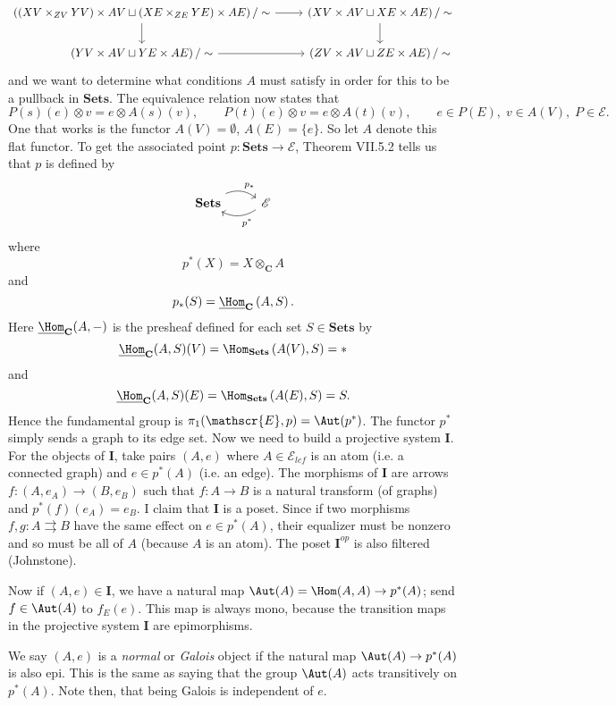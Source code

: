 \[ \begin{tikzcd}
\left( \left( XV \times_{ZV} YV \right) \times AV \sqcup \left( XE \times_{ZE} YE \right) \times AE\right) / \sim \arrow[r] \arrow[d] & \left( XV \times AV \sqcup XE \times AE \right) / \sim \arrow[d] \\
\left( YV \times AV \sqcup YE \times AE \right) / \sim \arrow[r] & \left( ZV \times AV \sqcup ZE \times AE \right) / \sim
\end{tikzcd}\]
and we want to determine what conditions $A$ must satisfy in order for this to be a pullback in $\mathbf{Sets}$. The equivalence relation now states that
\[ P(s)(e) \otimes v = e \otimes A(s)(v), \qquad P(t)(e) \otimes v = e \otimes A(t)(v), \qquad e \in P(E), \; v \in A(V), \; P \in \mathscr{E}. \]
One that works is the functor $A(V) = \emptyset$, $A(E) = \{e\}$. So let $A$ denote this flat functor. To get the associated point $p : \mathbf{Sets} \to \mathscr{E}$, Theorem VII.5.2 tells us that $p$ is defined by
\[ \begin{tikzcd} \mathbf{Sets} \arrow[r, bend left, "p_*"] & \mathscr{E} \arrow[l, bend left, "p^*"] \end{tikzcd} \]
where
\[ p^*(X) = X \otimes_{\mathbf{C}} A \]
and
\[ p_*(S) = \underline{\Hom}_{\mathbf{C}}\left(A, S\right). \]
Here $\underline{\Hom}_{\mathbf{C}}(A,-)$ is the presheaf defined for each set $S \in \mathbf{Sets}$ by
\[ \underline{\Hom}_{\mathbf{C}}(A,S)(V) = \Hom_{\mathbf{Sets}}\left(A(V), S\right) = * \]
and
\[ \underline{\Hom}_{\mathbf{C}}(A,S)(E) = \Hom_{\mathbf{Sets}}\left(A(E), S\right) = S. \]
Hence the fundamental group is $\pi_1(\mathscr{E},p) = \Aut(p^*)$. The functor $p^*$ simply sends a graph to its edge set. Now we need to build a projective system $\mathbf{I}$. For the objects of $\mathbf{I}$, take pairs $(A,e)$ where $A \in \mathscr{E}_{lcf}$ is an atom (i.e. a connected graph) and $e \in p^*(A)$ (i.e. an edge). The morphisms of $\mathbf{I}$ are arrows $f : (A,e_A) \to (B,e_B)$ such that $f : A \to B$ is a natural transform (of graphs) and $p^*(f)(e_A) = e_B$. I claim that $\mathbf{I}$ is a poset. Since if two morphisms $f,g : A \rightrightarrows B$ have the same effect on $e \in p^*(A)$, their equalizer must be nonzero and so must be all of $A$ (because $A$ is an atom).
The poset $\mathbf{I}^{op}$ is also filtered (Johnstone).

Now if $(A,e) \in \mathbf{I}$, we have a natural map $\Aut(A) = \Hom(A,A) \to p^*(A)$; send $f \in \Aut(A)$ to $f_E(e)$. This map is always mono, because the transition maps in the projective system $\mathbf{I}$ are epimorphisms.
\begin{definition}
We say $(A,e)$ is a \emph{normal} or \emph{Galois} object if the natural map $\Aut(A) \to p^*(A)$ is also epi. This is the same as saying that the group $\Aut(A)$ acts transitively on $p^*(A)$. Note then, that being Galois is independent of $e$.
\end{definition}

